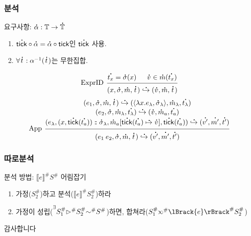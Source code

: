 \documentclass{beamer}
\theoremstyle{definition}
\newcommand*{\cons}{:{\hspace{-0.7em}}:}
\newcommand*{\prexists}[2][black]{\prescript{\textcolor{#1}{\exists}}{}{#2}}
\newcommand*{\A}[1]{\overset{\,_{\mbox{\Large .}}}{#1}}
\newcommand*{\Abs}[1]{{#1}^{\#}}
\newcommand*{\Time}{\mathbb{T}}
\newcommand*{\ctx}{\sigma}
\newcommand*{\mem}{m}
\newcommand*{\semarrow}{\hookrightarrow}
\newcommand*{\semlink}{\mathbin{\rotatebox[origin=c]{180}{$\propto$}}}
\newcommand*{\equivalent}{\sim}
\newcommand*{\sembracket}[1]{\lBrack{#1}\rBrack}
\newcommand*{\tick}{\mathsf{tick}}
\begin{document}
\begin{frame}[c]
  \frametitle{분석}
  요구사항: $\A\alpha:\Time\rightarrow\A\Time$
  \begin{enumerate}
    \item $\A\tick\circ\A\alpha=\A\alpha\circ\tick$인 $\A\tick$ 사용.
    \item $\forall\A{t}:\alpha^{-1}(\A{t})$는 무한집합.
  \end{enumerate}
  {\footnotesize\[
    \begin{prooftree}
      \hypo{\A{t_x}=\A{\ctx}(x)}
      \hypo{\A{v}\in\A\mem(\A{t_x})}
      \infer[left label=ExprID]2{
      (x, \A{\ctx}, \A\mem, \A{t})
      \A\semarrow
      (\A{v}, \A\mem, \A{t})
      }
    \end{prooftree}
  \]
  \[
    \begin{prooftree}
      \hypo{
        \begin{matrix}
          (e_{1}, \A{\ctx}, \A\mem, \A{t})
          \A\semarrow
          (\langle\lambda x.e_{\lambda}, \A{\ctx}_{\lambda}\rangle, \A\mem_{\lambda}, \A{t_\lambda}) \\
          (e_{2}, \A{\ctx}, \A\mem_{\lambda}, \A{t_\lambda})
          \A\semarrow
          (\A{v}, \A\mem_{a}, \A{t_a})                                                               \\
          (e_{\lambda}, (x, \A\tick(\A{t_a}))\cons \A{\ctx}_{\lambda}, \A\mem_{a}[\A\tick(\A{t_a})\A\mapsto \A{v}], \A\tick(\A{t_a}))
          \A\semarrow
          (\A{v'}, \A{\mem'},\A{t'})
        \end{matrix}
      }
      \infer[left label={App}]1{
      (e_{1}\:e_{2}, \A{\ctx}, \A\mem, \A{t})
      \A\semarrow
      (\A{v'}, \A{\mem'},\A{t'})
      }
    \end{prooftree}
  \]}
\end{frame}
\begin{frame}[c]
  \frametitle{따로분석}
  분석 방법: $\Abs{\sembracket{e}}\Abs{S}$ 어림잡기
  \begin{enumerate}
    \item 가정($\Abs{S}_2$)하고 분석($\Abs{\sembracket{e}}\Abs{S}_2$)하라
    \item 가정이 성립($\prexists{\Abs{S}_1}\Abs\rhd\Abs{S}_2\Abs\equivalent\Abs{S}$)하면, 합쳐라($\Abs{S}_1\Abs\semlink\Abs{\sembracket{e}}\Abs{S}_2$)
  \end{enumerate}
\end{frame}
\begin{frame}[c]
  \centering\LARGE
  감사합니다
\end{frame}
\end{document}
